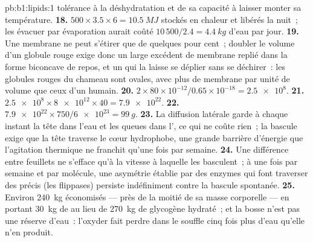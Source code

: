 \begin{solution}{pb:b1:lipids:1}
tolérance à la déshydratation et de sa capacité à laisser monter sa
température.
\textbf{18.} $500\times 3.5\times 6 = \qty{10.5}{MJ}$ stockés en chaleur et libérés la nuit~; les évacuer par évaporation aurait coûté $10\,500/2.4 = \qty{4.4}{kg}$ d'eau par jour.
\textbf{19.} Une membrane ne peut s'étirer que de quelques pour cent~;
doubler le volume d'un globule rouge exige donc un large excédent de
membrane replié dans la forme biconcave de repos, et un 
qui la laisse se déplier sans se déchirer~: les globules rouges du
chameau sont ovales, avec plus de membrane par unité de volume que ceux
d'un humain.
\textbf{20.} $2\times 80\times 10^{-12}/0.65\times 10^{-18} = \num{2.5e8}$.
\textbf{21.} $\num{2.5e8}\times\num{8e12}\times 40 = \num{7.9e22}$.
\textbf{22.} $\num{7.9e22}\times 750/\num{6e23} = \qty{99}{g}$.
\textbf{23.} La diffusion latérale garde à chaque instant la tête dans
l'eau et les queues dans l', ce qui ne coûte rien~; la bascule
exige que la tête  traverse le cœur hydrophobe, une grande
barrière d'énergie que l'agitation thermique ne franchit qu'une fois par
semaine.
\textbf{24.} Une différence entre feuillets ne s'efface qu'à la vitesse
à laquelle les  basculent~; à une fois par semaine et par
molécule, une asymétrie établie par des enzymes qui font traverser des
 précis (les flippases) persiste indéfiniment contre la bascule
spontanée.
\textbf{25.} Environ \qty{240}{kg} économisés --- près de la moitié de
sa masse corporelle --- en portant \qty{30}{kg} de  au lieu de
\qty{270}{kg} de glycogène hydraté~; et la bosse n'est pas une réserve
d'eau~: l'oxyder fait perdre dans le souffle cinq fois plus d'eau qu'elle
n'en produit.
\end{solution}
